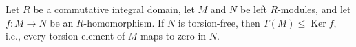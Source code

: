 Let $R$ be a commutative integral domain, let $M$ and $N$ be left $R$-modules, and let $f: M \rightarrow N$ be an $R$-homomorphism. If $N$ is torsion-free, then $T(M) \leq \operatorname{Ker} f$, i.e., every torsion element of $M$ maps to zero in $N$.
